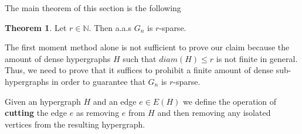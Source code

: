 \documentclass[12pt,notitlepage,a4paper]{article}
\theoremstyle{definition}
\newtheorem{theorem}{Theorem}[section]
\newtheorem{lemma}{Lemma}[section]
\newcommand{\N}{\mathbb{N}}
\begin{document}
%

The main theorem of this section is the following
\begin{theorem} \label{thm:sparse}
	Let $r\in \N$. Then a.a.s $G_n$ is $r$-sparse. 
\end{theorem}

	The first moment method alone is not sufficient
	to prove our claim because the amount of dense 
	hypergraphs	$H$ such that $diam(H)\leq r$ is not finite
	in general. Thus, we need to prove that it suffices to
	prohibit a finite amount of dense sub-hypergraphs in order
	to guarantee that $G_n$ is $r$-sparse.\par
	Given an hypergraph $H$ and an edge $e\in E(H)$ we
	define the operation of \textbf{cutting} the edge 
	$e$ as removing $e$ from $H$ and then removing any isolated
	vertices from the resulting hypergraph. \par
\end{document}
